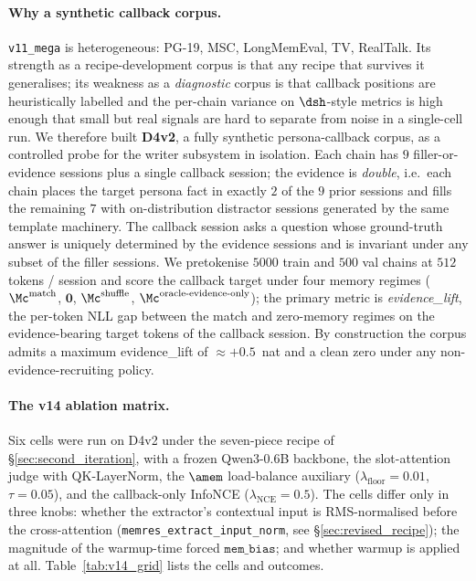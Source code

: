 \paragraph{Why a synthetic callback corpus.}
\texttt{v11\_mega} is heterogeneous: PG-19, MSC, LongMemEval, TV,
RealTalk. Its strength as a recipe-development corpus is that any
recipe that survives it generalises; its weakness as a
\emph{diagnostic} corpus is that callback positions are
heuristically labelled and the per-chain variance on
$\dsh$-style metrics is high enough that small but real signals are
hard to separate from noise in a single-cell run. We therefore built
\textbf{D4v2}, a fully synthetic persona-callback corpus, as a
controlled probe for the writer subsystem in isolation. Each chain
has $9$ filler-or-evidence sessions plus a single callback session;
the evidence is \emph{double}, i.e.\ each chain places the
target persona fact in exactly $2$ of the $9$ prior sessions and
fills the remaining $7$ with on-distribution distractor sessions
generated by the same template machinery. The callback session
asks a question whose ground-truth answer is uniquely determined by
the evidence sessions and is invariant under any subset of
the filler sessions. We pretokenise $5000$ train and $500$ val
chains at $512$ tokens / session and score the callback target
under four memory regimes ($\Mc^{\text{match}}$, $\mathbf{0}$,
$\Mc^{\text{shuffle}}$, $\Mc^{\text{oracle-evidence-only}}$); the
primary metric is \emph{evidence\_lift}, the per-token NLL gap
between the match and zero-memory regimes on the evidence-bearing
target tokens of the callback session. By construction the corpus
admits a maximum evidence\_lift of $\approx +0.5$~nat and a clean
zero under any non-evidence-recruiting policy.

\paragraph{The v14 ablation matrix.} Six cells were run on D4v2
under the seven-piece recipe of \S\ref{sec:second_iteration}, with a
frozen Qwen3-0.6B backbone, the slot-attention judge with
QK-LayerNorm, the $\amem$ load-balance auxiliary
($\lambda_{\text{floor}}{=}0.01$, $\tau{=}0.05$), and the
callback-only InfoNCE
($\lambda_{\text{NCE}}{=}0.5$). The cells differ only in three
knobs: whether the extractor's contextual input is
RMS-normalised before the cross-attention
(\texttt{memres\_extract\_input\_norm}, see
\S\ref{sec:revised_recipe}); the magnitude of the warmup-time
forced $\texttt{mem\_bias}$; and whether warmup is applied at all.
Table~\ref{tab:v14_grid} lists the cells and outcomes.

